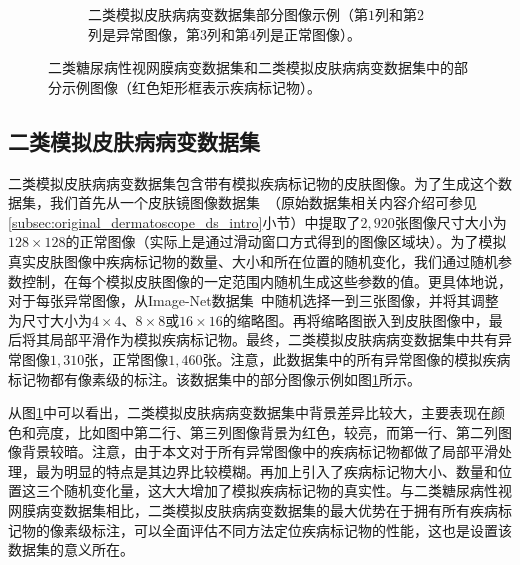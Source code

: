 \begin{figure}[h!]
\begin{subfigure}{0.48\textwidth}
		\caption{二类模拟皮肤病病变数据集部分图像示例（第$1$列和第$2$列是异常图像，第$3$列和第$4$列是正常图像）。}
		\label{subfig:bin_simulate_skin_example}
	\end{subfigure}
	\caption[本章实验数据集部分示例图像]{二类糖尿病性视网膜病变数据集和二类模拟皮肤病病变数据集中的部分示例图像（红色矩形框表示疾病标记物）。}
	\label{mul_fig:bin_ds_example}
\end{figure}
\subsection{二类模拟皮肤病病变数据集}\label{subsec:bin_simulated_skin_ds}
二类模拟皮肤病病变数据集包含带有模拟疾病标记物的皮肤图像。为了生成这个数据集，我们首先从一个皮肤镜图像数据集~\cite{codella2018skin}（原始数据集相关内容介绍可参见\ref{subsec:original_dermatoscope_ds_intro}小节）中提取了$2,920$张图像尺寸大小为$128\times128$的正常图像（实际上是通过滑动窗口方式得到的图像区域块）。为了模拟真实皮肤图像中疾病标记物的数量、大小和所在位置的随机变化，我们通过随机参数控制，在每个模拟皮肤图像的一定范围内随机生成这些参数的值。更具体地说，对于每张异常图像，从Image-Net数据集~\cite{deng2009imagenet}中随机选择一到三张图像，并将其调整为尺寸大小为$4\times 4$、$8\times 8$或$16\times 16$的缩略图。再将缩略图嵌入到皮肤图像中，最后将其局部平滑作为模拟疾病标记物。最终，二类模拟皮肤病病变数据集中共有异常图像$1,310$张，正常图像$1,460$张。注意，此数据集中的所有异常图像的模拟疾病标记物都有像素级的标注。该数据集中的部分图像示例如图\ref{subfig:bin_simulate_skin_example}所示。

从图\ref{subfig:bin_simulate_skin_example}中可以看出，二类模拟皮肤病病变数据集中背景差异比较大，主要表现在颜色和亮度，比如图中第二行、第三列图像背景为红色，较亮，而第一行、第二列图像背景较暗。注意，由于本文对于所有异常图像中的疾病标记物都做了局部平滑处理，最为明显的特点是其边界比较模糊。再加上引入了疾病标记物大小、数量和位置这三个随机变化量，这大大增加了模拟疾病标记物的真实性。与二类糖尿病性视网膜病变数据集相比，二类模拟皮肤病病变数据集的最大优势在于拥有所有疾病标记物的像素级标注，可以全面评估不同方法定位疾病标记物的性能，这也是设置该数据集的意义所在。
